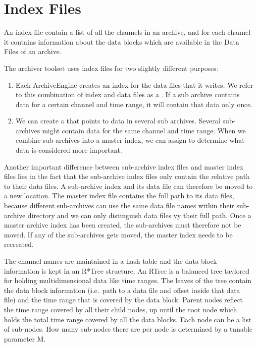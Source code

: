 \section{Index Files}
An index file contain a list of all the channels in an archive, and
for each channel it contains information about the data blocks which
are available in the Data Files of an archive.

\noindent The archiver toolset uses index files for two slightly different
purposes:
\begin{enumerate}
\item Each ArchiveEngine creates an index for the data files
      that it writes.
      We refer to this combination of index and data files
      as a .
      If a sub archive contains data for a certain channel and time
      range, it will contain that data only once.
\item We can create a  that points to data
      in several sub archives.
      Several sub-archives might contain data for the same channel
      and time range. When we combine sub-archives into a master
      index, we can assign  to
      determine what data is considered more important.
\end{enumerate}

\noindent Another important difference between sub-archive index files
and master index files lies in the fact that the sub-archive index
files only contain the relative path to their data files.
A sub-archive index and its data file can therefore be moved to a new
location.
The master index file contains the full path to its data files,
because different sub-archives can use the same data file names within
their sub-archive directory and we can only distinguish data files vy
their full path.
Once a master archive index has been created, the sub-archives must
therefore not be moved. If any of the sub-archives gets moved, the
master index needs to be recreated.

The channel names are maintained in a hash table and the
data block information is kept in an R*Tree structure.
An RTree \cite{guttman84} is a balanced tree taylored for holding
multidimensional data like time ranges.
The leaves of the tree contain the data block
information (i.e.\ path to a data file and offset inside that data
file) and the time range that is covered by the data block. Parent
nodes reflect the time range covered by all their child nodes, up
until the root node which holds the total time range covered by all
the data blocks. Each node can be a list of sub-nodes. How many
sub-nodes there are per node is determined by a tunable parameter M.

